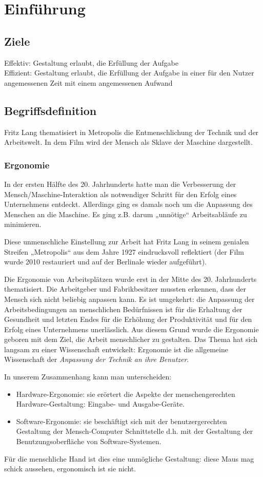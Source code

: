 \section{Einführung}
\subsection{Ziele}
Effektiv: Gestaltung erlaubt, die Erfüllung der Aufgabe\\
Effizient: Gestaltung erlaubt, die Erfüllung der Aufgabe in einer für den Nutzer angemessenen Zeit mit einem angemessenen Aufwand
\subsection{Begriffsdefinition}
Fritz Lang thematisiert in Metropolis die Entmenschlichung der Technik und der Arbeitswelt. In dem Film wird der Mensch als Sklave der Maschine dargestellt.
\subsubsection{Ergonomie}
In der ersten Hälfte des 20. Jahrhunderts hatte man die Verbesserung der Mensch/Maschine-Interaktion als notwendiger Schritt für den Erfolg eines Unternehmens entdeckt.  Allerdings ging es damals noch um die Anpassung des Menschen an die Maschine. Es ging z.B. darum „unnötige“ Arbeitsabläufe zu minimieren.

Diese unmenschliche Einstellung zur Arbeit hat Fritz Lang in seinem genialen Streifen „Metropolis“ aus dem Jahre 1927 eindrucksvoll reflektiert (der Film wurde 2010 restauriert und auf der Berlinale wieder aufgeführt).

Die Ergonomie von Arbeitsplätzen wurde erst in der Mitte des 20. Jahrhunderts thematisiert. Die Arbeitgeber und Fabrikbesitzer mussten erkennen, dass der Mensch sich nicht beliebig anpassen kann. Es ist umgekehrt: die Anpassung der Arbeitsbedingungen an menschlichen Bedürfnissen ist für die Erhaltung der Gesundheit und letzten Endes für die Erhöhung der Produktivität und für den Erfolg eines Unternehmens unerlässlich. Aus diesem Grund wurde die Ergonomie geboren mit dem Ziel, die Arbeit menschlicher zu gestalten. Das Thema hat sich langsam zu einer Wissenschaft entwickelt: Ergonomie ist die allgemeine Wissenschaft der \emph{Anpassung der Technik an ihre Benutzer}. 

In unserem Zusammenhang kann man unterscheiden: 
\begin{itemize}
\item Hardware-Ergonomie: sie erörtert die Aspekte der menschengerechten Hardware-Ge\-stal\-tung: Eingabe- und Ausgabe-Geräte.
\item Software-Ergonomie: sie beschäftigt sich mit der benutzergerechten Gestaltung der Mensch-Computer Schnittstelle d.h. mit der Gestaltung der Benutzungsoberfläche von Software-Systemen.
\end{itemize}
Für die menschliche Hand ist dies eine unmögliche Gestaltung: diese Maus mag schick aussehen, ergonomisch ist sie nicht.

